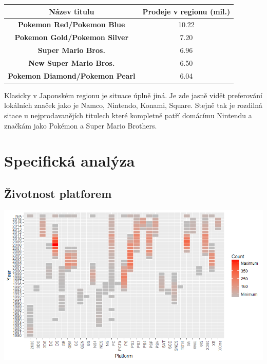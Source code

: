 \documentclass[a4paper,11pt]{article}
\begin{document}
\begin{center}
\begin{tabular}{|c|c|}
\hline
\textbf{Název titulu}                  & \textbf{Prodeje v regionu (mil.)} \\ \hline
\textbf{Pokemon Red/Pokemon Blue}      & 10.22                             \\ \hline
\textbf{Pokemon Gold/Pokemon Silver}   & 7.20                              \\ \hline
\textbf{Super Mario Bros.}             & 6.96                              \\ \hline
\textbf{New Super Mario Bros.}         & 6.50                              \\ \hline
\textbf{Pokemon Diamond/Pokemon Pearl} & 6.04                              \\ \hline
\end{tabular}
\end{center}

Klasicky v Japonském regionu je situace úplně jiná. Je zde jasně vidět preferování lokálních značek jako je Namco, Nintendo, Konami, Square. Stejně tak je rozdilná sitace u nejprodavanějích titulech které kompletně patří domácímu Nintendu a značkám jako Pokémon a Super Mario Brothers.

\newpage


\section{Specifická analýza}

\subsection{Životnost platforem}

\includegraphics[scale=0.75]{Rplot07}
\end{document}
